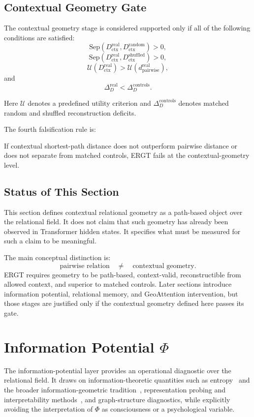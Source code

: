 \documentclass[11pt]{article}
\begin{document}
\subsection{Contextual Geometry Gate}

The contextual geometry stage is considered supported only if all of the following conditions are satisfied:
\[
\mathrm{Sep}(D_{\mathrm{ctx}}^{\mathrm{real}},D_{\mathrm{ctx}}^{\mathrm{random}})>0,
\]
\[
\mathrm{Sep}(D_{\mathrm{ctx}}^{\mathrm{real}},D_{\mathrm{ctx}}^{\mathrm{shuffled}})>0,
\]
\[
\mathcal{U}(D_{\mathrm{ctx}}^{\mathrm{real}})>
\mathcal{U}(d_{\mathrm{pairwise}}^{\mathrm{real}}),
\]
and
\[
\Delta_D^{\mathrm{real}}<\Delta_D^{\mathrm{controls}}.
\]

Here $\mathcal{U}$ denotes a predefined utility criterion and $\Delta_D^{\mathrm{controls}}$ denotes matched random and shuffled reconstruction deficits.

The fourth falsification rule is:
\begin{ergtclaim}
If contextual shortest-path distance does not outperform pairwise distance or does not separate from matched controls, ERGT fails at the contextual-geometry level.
\end{ergtclaim}

\subsection{Status of This Section}

This section defines contextual relational geometry as a path-based object over the relational field. It does not claim that such geometry has already been observed in Transformer hidden states. It specifies what must be measured for such a claim to be meaningful.

The main conceptual distinction is:
\[
\text{pairwise relation}\quad\neq\quad\text{contextual geometry}.
\]
ERGT requires geometry to be path-based, context-valid, reconstructible from allowed context, and superior to matched controls. Later sections introduce information potential, relational memory, and GeoAttention intervention, but those stages are justified only if the contextual geometry defined here passes its gate.


\section{Information Potential $\Phi$}
\noindent The information-potential layer provides an operational diagnostic over the relational field. It draws on information-theoretic quantities such as entropy~\cite{shannon1948mathematical} and the broader information-geometric tradition~\cite{amari2016information}, representation probing and interpretability methods~\cite{alain2017understanding,hewitt2019structural,belinkov2019analysis}, and graph-structure diagnostics, while explicitly avoiding the interpretation of $\Phi$ as consciousness or a psychological variable.
\end{document}
